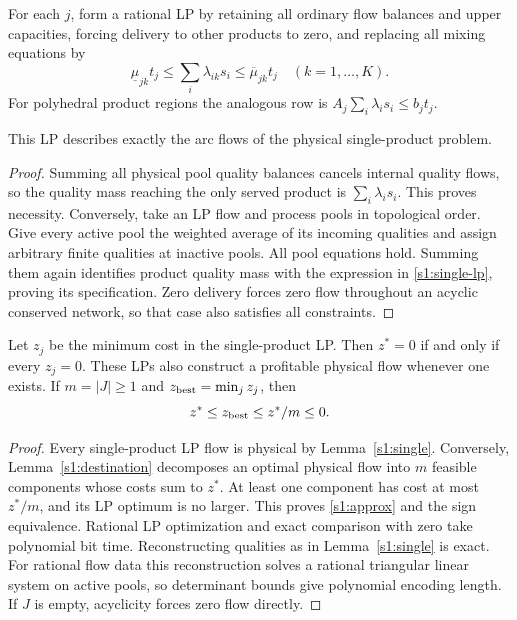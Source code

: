 For each $j$, form a rational LP by retaining all ordinary flow balances
and upper capacities, forcing delivery to other products to zero, and
replacing all mixing equations by
\begin{equation}
 \underline\mu_{jk}t_j\le\sum_i\lambda_{ik}s_i
                   \le\overline\mu_{jk}t_j\quad(k=1,\ldots,K).
 \label{s1:single-lp}
\end{equation}
For polyhedral product regions the analogous row is
$A_j\sum_i\lambda_is_i\le b_jt_j$.

\begin{lemma}\label{s1:single}
This LP describes exactly the arc flows of the physical single-product
problem.
\end{lemma}
\begin{proof}
Summing all physical pool quality balances cancels internal quality
flows, so the quality mass reaching the only served product is
$\sum_i\lambda_is_i$. This proves necessity. Conversely, take an LP
flow and process pools in topological order. Give every active pool the
weighted average of its incoming qualities and assign arbitrary finite
qualities at inactive pools. All pool equations hold. Summing them again
identifies product quality mass with the expression in
\eqref{s1:single-lp}, proving its specification. Zero delivery forces
zero flow throughout an acyclic conserved network, so that case also
satisfies all constraints.
\end{proof}

\begin{theorem}\label{s1:sign}
Let $z_j$ be the minimum cost in the single-product LP. Then
$z^*=0$ if and only if every $z_j=0$. These LPs also construct a
profitable physical flow whenever one exists. If $m=|J|\ge1$ and
$z_{\rm best}=\min_jz_j$, then
\begin{equation}
 z^*\le z_{\rm best}\le z^*/m\le0.\label{s1:approx}
\end{equation}
\end{theorem}
\begin{proof}
Every single-product LP flow is physical by Lemma~\ref{s1:single}.
Conversely, Lemma~\ref{s1:destination} decomposes an optimal physical
flow into $m$ feasible components whose costs sum to $z^*$.
At least one component has cost at most $z^*/m$, and its LP optimum is
no larger. This proves \eqref{s1:approx} and the sign equivalence.
Rational LP optimization and exact comparison with zero take polynomial
bit time. Reconstructing qualities as in Lemma~\ref{s1:single} is exact.
For rational flow data this reconstruction solves a rational triangular
linear system on active pools, so determinant bounds give polynomial
encoding length. If $J$ is empty, acyclicity forces zero flow directly.
\end{proof}

